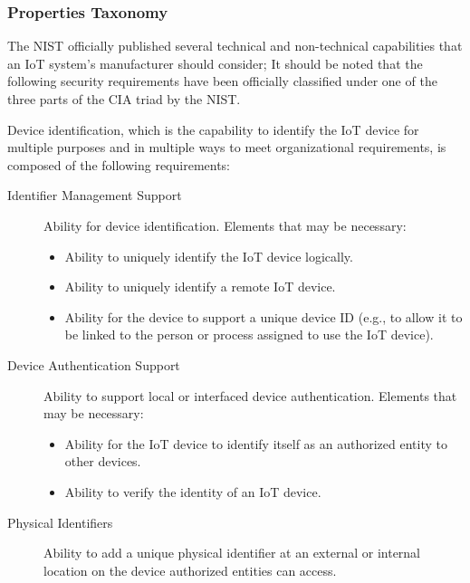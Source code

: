 \subsubsection{Properties Taxonomy}
The NIST officially published several technical and non-technical capabilities that an IoT system’s manufacturer should consider; It should be noted that the following security requirements have been officially classified under one of the three parts of the CIA triad by the NIST.

Device identification, which is the capability to identify the IoT device for multiple purposes and in multiple ways to meet organizational requirements, is composed of the following requirements:

\begin{description}
    \item[Identifier Management Support] Ability for device identification. Elements that may be necessary:
        \begin{itemize}
            \item Ability to uniquely identify the IoT device logically.
            \item Ability to uniquely identify a remote IoT device.
            \item Ability for the device to support a unique device ID (e.g., to allow it to be linked to the person or process assigned to use the IoT device).
        \end{itemize}
    \item[Device Authentication Support] Ability to support local or interfaced device authentication. Elements that may be necessary:
        \begin{itemize}
            \item Ability for the IoT device to identify itself as an authorized entity to other devices.
            \item Ability to verify the identity of an IoT device.
        \end{itemize}
    \item[Physical Identifiers] Ability to add a unique physical identifier at an external or internal location on the device authorized entities can access.
\end{description}

